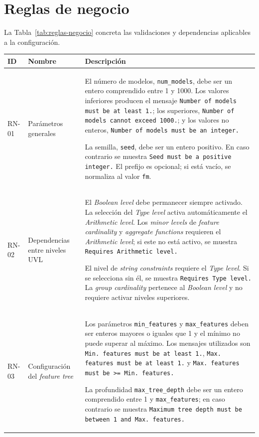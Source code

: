 \section{Reglas de negocio}
\label{sec:reglas_negocio}

La Tabla~\ref{tab:reglas-negocio} concreta las validaciones y dependencias aplicables a la configuración.

\begin{longtable}{@{}P{1.2cm} P{3.2cm}
P{\dimexpr\textwidth-4.4cm-4\tabcolsep\relax}@{}}

\toprule
\textbf{ID} & \textbf{Nombre} & \textbf{Descripción} \\
\midrule
\endhead

RN-01 &
Parámetros generales &
El número de modelos, \texttt{num\_models}, debe ser un entero comprendido
entre 1 y 1000. Los valores inferiores producen el mensaje
\texttt{Number of models must be at least 1.}; los superiores,
\texttt{Number of models cannot exceed 1000.}; y los valores no enteros,
\texttt{Number of models must be an integer.}

La semilla, \texttt{seed}, debe ser un entero positivo. En caso contrario se
muestra \texttt{Seed must be a positive integer.} El prefijo es opcional; si
está vacío, se normaliza al valor \texttt{fm}.
\\[1em]

RN-02 &
Dependencias entre niveles UVL &
El \textit{Boolean level} debe permanecer siempre activado. La selección del
\textit{Type level} activa automáticamente el \textit{Arithmetic level}. Los
\textit{minor levels} de \textit{feature cardinality} y
\textit{aggregate functions} requieren el \textit{Arithmetic level}; si este
no está activo, se muestra \texttt{Requires Arithmetic level.}

El nivel de \textit{string constraints} requiere el \textit{Type level}. Si se
selecciona sin él, se muestra \texttt{Requires Type level.} La
\textit{group cardinality} pertenece al \textit{Boolean level} y no requiere
activar niveles superiores.
\\[1em]

RN-03 &
Configuración del \textit{feature tree} &
Los parámetros \texttt{min\_features} y \texttt{max\_features} deben ser
enteros mayores o iguales que 1 y el mínimo no puede superar al máximo. Los
mensajes utilizados son \texttt{Min. features must be at least 1.},
\texttt{Max. features must be at least 1.} y
\texttt{Max. features must be >= Min. features.}

La profundidad \texttt{max\_tree\_depth} debe ser un entero comprendido entre
1 y \texttt{max\_features}; en caso contrario se muestra
\texttt{Maximum tree depth must be between 1 and Max. features.}


\end{longtable}
